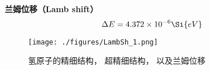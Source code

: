 
\textbf{兰姆位移（Lamb shift）}
\begin{equation}
\Delta E = 4.372\times 10^{-6} \Si{eV}
\end{equation}

\begin{figure}[ht]
\centering
\texttt{[image: ./figures/LambSh\_1.png]}
\caption{氢原子的精细结构， 超精细结构， 以及兰姆位移} \label{LambSh_fig1}
\end{figure}
